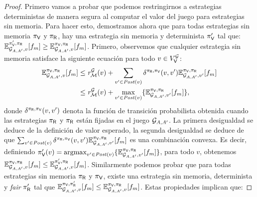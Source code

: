 \iffalse
\noindent
\begin{proof}
Primero vamos a probar que podemos restringirnos a estrategias deterministas de manera segura al computar el valor del juego para estrategias sin memoria.  Para hacer esto, demostramos ahora que para todas estrategias sin memoria $\pi_{\mathsf{V}}$ y $\pi_{\mathsf{R}}$, hay una estrategia sin memoria y determinista
$\pi_{\mathsf{V}}'$ tal que: $\mathbb{E}^{\pi_{\mathsf{V}}',\pi_{\mathsf{R}}}_{\mathcal{G}_{A,A'}, v}[f_{m}]  \geq \mathbb{E}^{\pi_{\mathsf{V}},\pi_{\mathsf{R}}}_{\mathcal{G}_{A,A'}, v}[f_{m}]$. Primero, observemos que cualquier estrategia sin memoria satisface la siguiente ecuación para todo $v \in V^{\mathcal{G}}_{\mathsf{V}}$:
\begin{align}
    \mathbb{E}_{\mathcal{G}_{A,A'},v}^{\pi_{\mathsf{V}},\pi_{\mathsf{R}}}[f_{m}]&  \leq \mathit{r}_{\mathcal{M}}^{\mathcal{G}}(v) + \sum_{v' \in \mathit{Post}(v)} \delta^{\pi_{\mathsf{R}},\pi_{\mathsf{V}}}(v,v')  \mathbb{E}_{\mathcal{G}_{A,A'},v'}^{\pi_{\mathsf{V}},\pi_{\mathsf{R}}}[f_{m}] \label{theo:det-fairness:eq3:l1}\\
    & \leq \mathit{r}_{\mathcal{M}}^{\mathcal{G}}(v)  + \max_{v' \in \mathit{Post}(v)} \{  \mathbb{E}_{\mathcal{G}_{A,A'},v'}^{\pi_{\mathsf{V}},\pi_{\mathsf{R}}}[f_{m}] \},
    \label{theo:det-fairness:eq3:l12}
\end{align}
\sloppy donde $\delta^{\pi_{\mathsf{R}},\pi_{\mathsf{V}}}(v,v')$ denota la función de transición probabilista obtenida cuando las estrategias $\pi_{\mathsf{R}}$ y $\pi_{\mathsf{R}}$
están fijadas en el juego $\mathcal{G}_{A,A'}$. La primera desigualdad se deduce de la definición de valor esperado, la segunda desigualdad se deduce de que $ \sum_{v' \in \mathit{Post}(v)} \delta^{\pi_{\mathsf{R}},\pi_{\mathsf{V}}}(v,v') \mathbb{E}_{\mathcal{G}_{A,A'},v'}^{\pi_{\mathsf{V}},\pi_{\mathsf{R}}}[f_{m}] $ es una combinación convexa. Es decir,  definiendo $\pi_{\mathsf{V}}'(v) = \operatorname*{argmax}_{v' \in \mathit{Post}(v)}  \{ \mathbb{E}_{\mathcal{G}_{A,A'},v'}^{\pi_{\mathsf{V}},\pi_{\mathsf{R}}}[f_{m}] \}$, para todo $v$,  obtenemos
$\mathbb{E}_{\mathcal{G}_{A,A'},v}^{\pi_{\mathsf{V}},\pi_{\mathsf{R}}}[f_{m}] \leq \mathbb{E}_{\mathcal{G}_{A,A'},v}^{\pi_{\mathsf{V}}',\pi_{\mathsf{R}}}[f_{m}]$. 
Similarmente podemos probar que para todas estrategias sin memoria $\pi_{\mathsf{R}}$ y $\pi_{\mathsf{V}}$, existe una estrategia sin memoria, determinista y \emph{fair} 
$\pi_{\mathsf{R}}'$ tal que  $\mathbb{E}_{\mathcal{G}_{A,A'},v}^{\pi_{\mathsf{V}},\pi_{\mathsf{R}}'}[f_{m}] \leq \mathbb{E}_{\mathcal{G}_{A,A'},v}^{\pi_{\mathsf{V}},\pi_{\mathsf{R}}}[f_{m}]$.  Estas propiedades implican que:

\end{proof}
